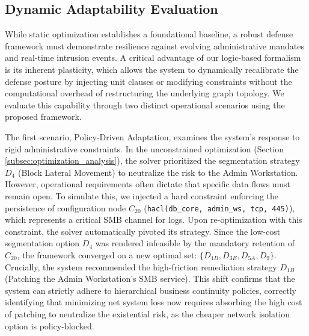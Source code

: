 \documentclass[conference]{IEEEtran}
\theoremstyle{definition} %
\theoremstyle{plain} %
\begin{document}
\subsection{Dynamic Adaptability Evaluation}
\label{subsec:dynamic_flexibility}

While static optimization establishes a foundational baseline, a robust defense framework must demonstrate resilience against evolving administrative mandates and real-time intrusion events. A critical advantage of our logic-based formalism is its inherent plasticity, which allows the system to dynamically recalibrate the defense posture by injecting unit clauses or modifying constraints without the computational overhead of restructuring the underlying graph topology. We evaluate this capability through two distinct operational scenarios using the proposed framework.

The first scenario, Policy-Driven Adaptation, examines the system's response to rigid administrative constraints. In the unconstrained optimization (Section \ref{subsec:optimization_analysis}), the solver prioritized the segmentation strategy $D_4$ (Block Lateral Movement) to neutralize the risk to the Admin Workstation. However, operational requirements often dictate that specific data flows must remain open. To simulate this, we injected a hard constraint enforcing the persistence of configuration node $C_{20}$ (\texttt{hacl(db\_core, admin\_ws, tcp, 445)}), which represents a critical SMB channel for logs. Upon re-optimization with this constraint, the solver automatically pivoted its strategy. Since the low-cost segmentation option $D_4$ was rendered infeasible by the mandatory retention of $C_{20}$, the framework converged on a new optimal set: $\{ D_{1B}, D_{3E}, D_{5A}, D_9 \}$. Crucially, the system recommended the high-friction remediation strategy $D_{1B}$ (Patching the Admin Workstation's SMB service). This shift confirms that the system can strictly adhere to hierarchical business continuity policies, correctly identifying that minimizing net system loss now requires absorbing the high cost of patching to neutralize the existential risk, as the cheaper network isolation option is policy-blocked.
\end{document}
